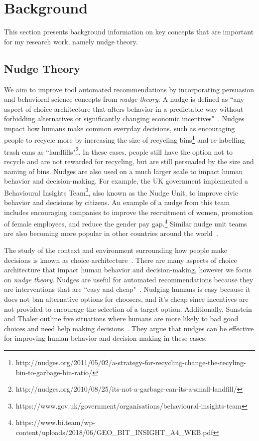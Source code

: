 \section{Background}

This section presents background information on key concepts that are important for my research work, namely nudge theory.

\subsection{Nudge Theory}

We aim to improve tool automated recommendations by incorporating persuasion and behavioral science concepts from \textit{nudge theory}. A nudge is defined as ``any aspect of choice architecture that alters behavior in a predictable way without forbidding alternatives or significantly changing economic incentives"~\cite[p.~6]{sunstein2008nudge}. Nudges impact how humans make common everyday decisions, such as encouraging people to recycle more by increasing the size of recycling bins\footnote{http://nudges.org/2011/05/02/a-strategy-for-recycling-change-the-recyling-bin-to-garbage-bin-ratio/} and re-labelling trash cans as ``landfills"\footnote{http://nudges.org/2010/08/25/its-not-a-garbage-can-its-a-small-landfill/}. In these cases, people still have the option not to recycle and are not rewarded for recycling, but are still persuaded by the size and naming of bins. Nudges are also used on a much larger scale to impact human behavior and decision-making. For example, the UK government implemented a Behavioural Insights Team\footnote{https://www.gov.uk/government/organisations/behavioural-insights-team}, also known as the Nudge Unit, to improve civic behavior and decisions by citizens. An example of a nudge from this team includes encouraging companies to improve the recruitment of women, promotion of female employees, and reduce the gender pay gap.\footnote{https://www.bi.team/wp-content/uploads/2018/06/GEO\_BIT\_INSIGHT\_A4\_WEB.pdf} Similar nudge unit teams are also becoming more popular in other countries around the world~\cite{DelBalzoNudging}.

The study of the context and environment surrounding how people make decisions is known as choice architecture~\cite{thaler2014choice}. There are many aspects of choice architecture that impact human behavior and decision-making, however we focus on \textit{nudge theory}. Nudges are useful for automated recommendations because they are interventions that are ``easy and cheap"~\cite[p.~6]{sunstein2008nudge}. Nudging humans is easy because it does not ban alternative options for choosers, and it's cheap since incentives are not provided to encourage the selection of a target option. Additionally, Sunstein and Thaler outline five situations where humans are more likely to bad good choices and need help making decisions~\cite[p.~74-82]{sunstein2008nudge}. They argue that nudges can be effective for improving human behavior and decision-making in these cases. %

